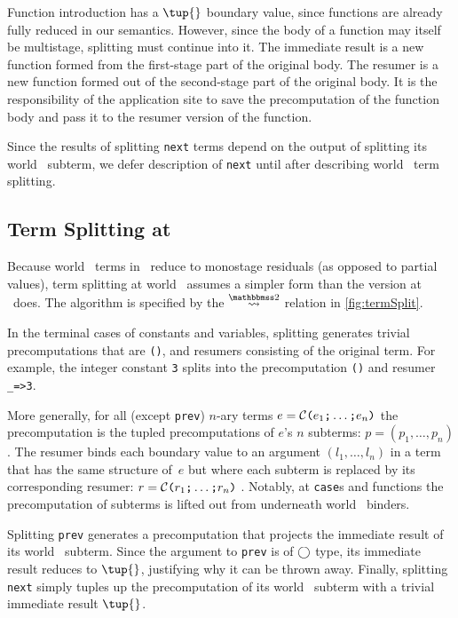 \begin{abstrsyn}
Function introduction has a $\tup{}$ boundary value,
since functions are already fully reduced in our semantics.
However, since the body of a function may itself be multistage, splitting must continue into it.
The immediate result is a new function formed from the first-stage part of the original body.
The resumer is a new function formed out of the second-stage part of the original body.
It is the responsibility of the application site to save the precomputation of the function body
and pass it to the resumer version of the function.

Since the results of splitting \texttt{next} terms depend on the output of
splitting its world \bbtwo\ subterm,
we defer description of \texttt{next} until after describing world \bbtwo\ term splitting.

\subsection{Term Splitting at \bbtwo}

Because world \bbtwo\ terms in \lang\ reduce to monostage residuals (as opposed to partial values),
term splitting at world \bbtwo\ assumes a simpler form than the version at \bbonem\ does. 
The algorithm is specified by the $\splittwosym$ relation in \cref{fig:termSplit}.

In the terminal cases of
constants and variables, splitting generates trivial precomputations that are \texttt{()}, and resumers consisting of the original term.
For example, the integer constant \texttt{3} splits into the
precomputation \texttt{()} and resumer \texttt{\_=>3}.

More generally, for all (except \texttt{prev}) 
$n$-ary terms $e = \mathcal{C}\texttt{(} e_1 \texttt{;} \ldots \texttt{;} e_n \texttt{)}$ 
the precomputation is the tupled precomputations of $e$'s $n$ subterms:
$p=(p_1,\ldots,p_n)$.  The resumer binds each boundary value to an
argument $(l_1,\ldots,l_n)$ in a term that has the same structure
of~$e$ but where each subterm is replaced by its corresponding resumer:
$r = \mathcal{C}\texttt{(} r_1 \texttt{;} \ldots \texttt{;} r_n \texttt{)}$ .
Notably, at \texttt{case}s and functions the
precomputation of subterms is lifted out from underneath world \bbtwo\ binders.  

Splitting \texttt{prev} generates a precomputation that projects the immediate
result of its world \bbone\ subterm.
Since the argument to \texttt{prev} is of $\bigcirc$ type, its immediate result reduces to $\tup{}$, justifying why it can be thrown away.
Finally, splitting \texttt{next} simply tuples up the precomputation of its
world \bbtwo\ subterm with a trivial immediate result $\tup{}$.


\end{abstrsyn}
